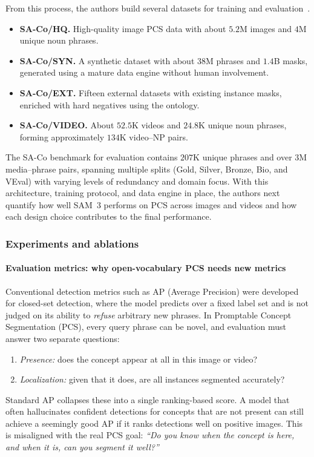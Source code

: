 \begin{enrichment}
\begin{enrichment}
		\newpage
		
		From this process, the authors build several datasets for training and evaluation~\cite{carion2025_sam3}.
		\begin{itemize}
			\item \textbf{SA-Co/HQ.} High-quality image PCS data with about $5.2$M images and $4$M unique noun phrases.
			\item \textbf{SA-Co/SYN.} A synthetic dataset with about $38$M phrases and $1.4$B masks, generated using a mature data engine without human involvement.
			\item \textbf{SA-Co/EXT.} Fifteen external datasets with existing instance masks, enriched with hard negatives using the ontology.
			\item \textbf{SA-Co/VIDEO.} About $52.5$K videos and $24.8$K unique noun phrases, forming approximately $134$K video--NP pairs.
		\end{itemize}
		The SA-Co benchmark for evaluation contains $207$K unique phrases and over $3$M media--phrase pairs, spanning multiple splits (Gold, Silver, Bronze, Bio, and VEval) with varying levels of redundancy and domain focus. With this architecture, training protocol, and data engine in place, the authors next quantify how well SAM~3 performs on PCS across images and videos and how each design choice contributes to the final performance.
		
		\subsubsection{Experiments and ablations}
		\label{subsubsec:chapter15_sam3_experiments}
		
		\paragraph{Evaluation metrics: why open-vocabulary PCS needs new metrics}
		
		Conventional detection metrics such as AP (Average Precision) were developed for closed-set detection, where the model predicts over a fixed label set and is not judged on its ability to \emph{refuse} arbitrary new phrases. In Promptable Concept Segmentation (PCS), every query phrase can be novel, and evaluation must answer two separate questions:
		\begin{enumerate}
			\item \emph{Presence:} does the concept appear at all in this image or video?
			\item \emph{Localization:} given that it does, are all instances segmented accurately?
		\end{enumerate}
		Standard AP collapses these into a single ranking-based score. A model that often hallucinates confident detections for concepts that are not present can still achieve a seemingly good AP if it ranks detections well on positive images. This is misaligned with the real PCS goal:
		\emph{``Do you know when the concept is here, and when it is, can you segment it well?''}
		

\end{enrichment}
\end{enrichment}
